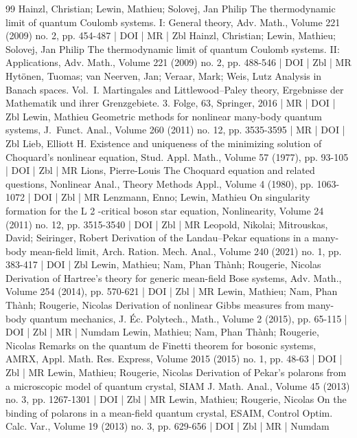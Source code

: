 \documentclass[10pt]{amsart}
\theoremstyle{definition}\newtheorem{defi}[theo]{Definition}\newtheorem{rema}[theo]{Remark}\newtheorem{exam}[theo]{Example}\newtheorem{exem}[theo]{Example}\newtheorem{nota}[theo]{Notation}
\newcommand{\1}{\mathds{1}}
\begin{document}
\begin{thebibliography}{99}
 Hainzl, Christian; Lewin, Mathieu; Solovej, Jan Philip The thermodynamic limit of quantum Coulomb systems. I: General theory, Adv. Math., Volume 221 (2009) no. 2, pp. 454-487 | DOI | MR | Zbl
 Hainzl, Christian; Lewin, Mathieu; Solovej, Jan Philip The thermodynamic limit of quantum Coulomb systems. II: Applications, Adv. Math., Volume 221 (2009) no. 2, pp. 488-546 | DOI | Zbl | MR
 Hytönen, Tuomas; van Neerven, Jan; Veraar, Mark; Weis, Lutz Analysis in Banach spaces. Vol. I. Martingales and Littlewood–Paley theory, Ergebnisse der Mathematik und ihrer Grenzgebiete. 3. Folge, 63, Springer, 2016 | MR | DOI | Zbl
 Lewin, Mathieu Geometric methods for nonlinear many-body quantum systems, J. Funct. Anal., Volume 260 (2011) no. 12, pp. 3535-3595 | MR | DOI | Zbl
 Lieb, Elliott H. Existence and uniqueness of the minimizing solution of Choquard’s nonlinear equation, Stud. Appl. Math., Volume 57 (1977), pp. 93-105 | DOI | Zbl | MR
 Lions, Pierre-Louis The Choquard equation and related questions, Nonlinear Anal., Theory Methods Appl., Volume 4 (1980), pp. 1063-1072 | DOI | Zbl | MR
 Lenzmann, Enno; Lewin, Mathieu On singularity formation for the L 2 -critical boson star equation, Nonlinearity, Volume 24 (2011) no. 12, pp. 3515-3540 | DOI | Zbl | MR
 Leopold, Nikolai; Mitrouskas, David; Seiringer, Robert Derivation of the Landau–Pekar equations in a many-body mean-field limit, Arch. Ration. Mech. Anal., Volume 240 (2021) no. 1, pp. 383-417 | DOI | Zbl
 Lewin, Mathieu; Nam, Phan Thành; Rougerie, Nicolas Derivation of Hartree’s theory for generic mean-field Bose systems, Adv. Math., Volume 254 (2014), pp. 570-621 | DOI | Zbl | MR
 Lewin, Mathieu; Nam, Phan Thành; Rougerie, Nicolas Derivation of nonlinear Gibbs measures from many-body quantum mechanics, J. Éc. Polytech., Math., Volume 2 (2015), pp. 65-115 | DOI | Zbl | MR | Numdam
 Lewin, Mathieu; Nam, Phan Thành; Rougerie, Nicolas Remarks on the quantum de Finetti theorem for bosonic systems, AMRX, Appl. Math. Res. Express, Volume 2015 (2015) no. 1, pp. 48-63 | DOI | Zbl | MR
 Lewin, Mathieu; Rougerie, Nicolas Derivation of Pekar’s polarons from a microscopic model of quantum crystal, SIAM J. Math. Anal., Volume 45 (2013) no. 3, pp. 1267-1301 | DOI | Zbl | MR
 Lewin, Mathieu; Rougerie, Nicolas On the binding of polarons in a mean-field quantum crystal, ESAIM, Control Optim. Calc. Var., Volume 19 (2013) no. 3, pp. 629-656 | DOI | Zbl | MR | Numdam

\end{thebibliography}
\end{document}
